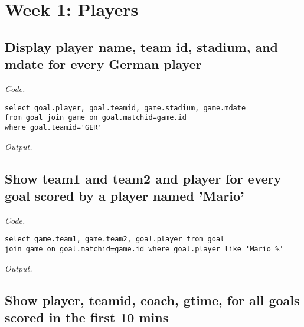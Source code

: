 \documentclass[12pt]{article}
\date{ }
\begin{document}
\tableofcontents

\newpage

\setlength{\fboxrule}{.5mm}\setlength{\fboxsep}{1.2mm}
\newlength{\boxlength}\setlength{\boxlength}{\textwidth}
\addtolength{\boxlength}{-4mm}
\begin{center}\end{center}
\vspace{5mm}

\section{Week 1: Players}

\subsection{Display player name, team id, stadium, and mdate for every German player}

\textit{Code.}

\begin{lstlisting}
select goal.player, goal.teamid, game.stadium, game.mdate
from goal join game on goal.matchid=game.id
where goal.teamid='GER'
\end{lstlisting}

\textit{Output.}\\

\subsection{Show team1 and team2 and player for every goal scored by a player named 'Mario'}

\textit{Code.}

\begin{lstlisting}
select game.team1, game.team2, goal.player from goal
join game on goal.matchid=game.id where goal.player like 'Mario %'
\end{lstlisting}

\textit{Output.}\\

\subsection{Show player, teamid, coach, gtime, for all goals scored in the first 10 mins}
\end{document}

